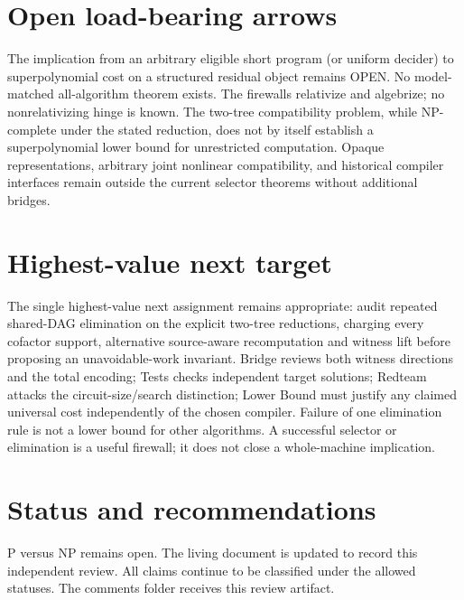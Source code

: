 \documentclass[11pt]{article}
\begin{document}
\section{Open load-bearing arrows}
The implication from an arbitrary eligible short program (or uniform decider) to superpolynomial cost on a structured residual object remains OPEN. No model-matched all-algorithm theorem exists. The firewalls relativize and algebrize; no nonrelativizing hinge is known. The two-tree compatibility problem, while NP-complete under the stated reduction, does not by itself establish a superpolynomial lower bound for unrestricted computation. Opaque representations, arbitrary joint nonlinear compatibility, and historical compiler interfaces remain outside the current selector theorems without additional bridges.

\section{Highest-value next target}
The single highest-value next assignment remains appropriate: audit repeated shared-DAG elimination on the explicit two-tree reductions, charging every cofactor support, alternative source-aware recomputation and witness lift before proposing an unavoidable-work invariant. Bridge reviews both witness directions and the total encoding; Tests checks independent target solutions; Redteam attacks the circuit-size/search distinction; Lower Bound must justify any claimed universal cost independently of the chosen compiler. Failure of one elimination rule is not a lower bound for other algorithms. A successful selector or elimination is a useful firewall; it does not close a whole-machine implication.

\section{Status and recommendations}
P versus NP remains open. The living document is updated to record this independent review. All claims continue to be classified under the allowed statuses. The comments folder receives this review artifact.

\end{document}
